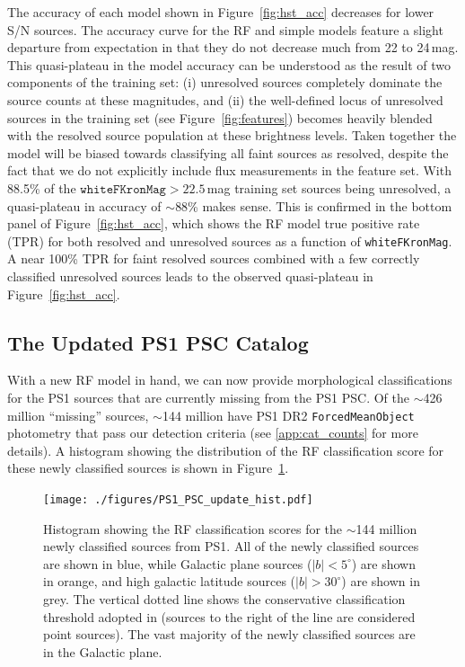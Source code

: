 \documentclass[twocolumn]{aastex63}
\begin{document}
The accuracy of each model shown in Figure~\ref{fig:hst_acc} decreases for
lower S/N sources. The accuracy curve for the RF and simple models feature a
slight departure from expectation in that they do not decrease much from 22 to
24\,mag. This quasi-plateau in the model accuracy can be understood as the
result of two components of the training set: (i) unresolved sources
completely dominate the source counts at these magnitudes, and (ii) the
well-defined locus of unresolved sources in the training set (see
Figure~\ref{fig:features}) becomes heavily blended with the resolved source
population at these brightness levels. Taken together the model will be biased
towards classifying all faint sources as resolved, despite the fact that we do
not explicitly include flux measurements in the feature set. With 88.5\% of
the $\mathtt{whiteFKronMag} > 22.5$\,mag training set sources being
unresolved, a quasi-plateau in accuracy of $\sim$88\% makes sense. This is
confirmed in the bottom panel of Figure~\ref{fig:hst_acc}, which shows the RF
model true positive rate (TPR) for both resolved and unresolved sources as a
function of \texttt{whiteFKronMag}. A near 100\% TPR for faint resolved
sources combined with a few correctly classified unresolved sources leads to
the observed quasi-plateau in Figure~\ref{fig:hst_acc}.

\subsection{The Updated PS1 PSC Catalog}\label{sec:ps1psc_update}

With a new RF model in hand, we can now provide morphological classifications
for the PS1 sources that are currently missing from the PS1 PSC. Of the
$\sim$426 million ``missing'' sources, $\sim$144 million have PS1 DR2
\texttt{ForcedMeanObject} photometry that pass our detection criteria (see
\ref{app:cat_counts} for more details). A histogram showing the distribution
of the RF classification score for these newly classified sources is shown in
Figure~\ref{fig:psc_update}.

\begin{figure}
    \centering
    \texttt{[image: ./figures/PS1\_PSC\_update\_hist.pdf]}
    \caption{Histogram showing the RF classification scores for the $\sim$144
    million newly classified sources from PS1. All of the newly classified
    sources are shown in blue, while Galactic plane sources ($|b| <
    5^{\circ}$) are shown in orange, and high galactic latitude sources ($|b|
    > 30^{\circ}$) are shown in grey. The vertical dotted line shows the
    conservative classification threshold adopted in \citet{Tachibana18}
    (sources to the right of the line are considered point sources). The vast
    majority of the newly classified sources are in the Galactic plane.}
    \label{fig:psc_update}
\end{figure}    
\end{document}
